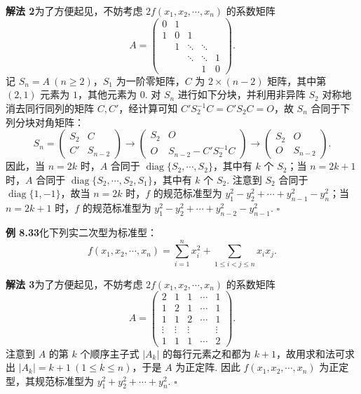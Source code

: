 \documentclass[UTF8,12pt,a4paper,fontset=fandol]{ctexart}
\begin{document}
\noindent\textbf{解法 2}\quad 为了方便起见，不妨考虑 $2f(x_1,x_2,\cdots,x_n)$ 的系数矩阵
\[
A=\left(\begin{array}{ccccc}
0 & 1 &        &        &   \\
1 & 0 & 1      &        &   \\
  & 1 & \ddots & \ddots &   \\
  &   & \ddots & \ddots & 1 \\
  &   &        & 1      & 0
\end{array}\right).
\]
记 $S_n=A\ (n\ge 2)$，$S_1$ 为一阶零矩阵，$C$ 为 $2\times(n-2)$ 矩阵，其中第 $(2,1)$ 元素为 $1$，其他元素为 $0$. 对 $S_n$ 进行如下分块，并利用非异阵 $S_2$ 对称地消去同行同列的矩阵 $C,C'$，经计算可知 $C'S_2^{-1}C=C'S_2C=O$，故 $S_n$ 合同于下列分块对角矩阵：
\[
S_n=\left(\begin{array}{cc}
S_2 & C\\
C' & S_{n-2}
\end{array}\right)
\to
\left(\begin{array}{cc}
S_2 & O\\
O & S_{n-2}-C'S_2^{-1}C
\end{array}\right)
\to
\left(\begin{array}{cc}
S_2 & O\\
O & S_{n-2}
\end{array}\right).
\]
因此，当 $n=2k$ 时，$A$ 合同于 $\operatorname{diag}\{S_2,\cdots,S_2\}$，其中有 $k$ 个 $S_2$；当 $n=2k+1$ 时，$A$ 合同于 $\operatorname{diag}\{S_2,\cdots,S_2,S_1\}$，其中有 $k$ 个 $S_2$. 注意到 $S_2$ 合同于 $\operatorname{diag}\{1,-1\}$，故当 $n=2k$ 时，$f$ 的规范标准型为 $y_1^2-y_2^2+\cdots+y_{n-1}^2-y_n^2$；当 $n=2k+1$ 时，$f$ 的规范标准型为 $y_1^2-y_2^2+\cdots+y_{n-2}^2-y_{n-1}^2$. $\ensuremath{\square}$

\noindent\textbf{例 8.33}\quad 化下列实二次型为标准型：
\[
f(x_1,x_2,\cdots,x_n)=\sum_{i=1}^n x_i^2+\sum_{1\le i<j\le n}x_ix_j.
\]

\noindent\textbf{解法 3}\quad 为了方便起见，不妨考虑 $2f(x_1,x_2,\cdots,x_n)$ 的系数矩阵
\[
A=\left(\begin{array}{ccccc}
2 & 1 & 1 & \cdots & 1\\
1 & 2 & 1 & \cdots & 1\\
1 & 1 & 2 & \cdots & 1\\
\vdots & \vdots & \vdots & & \vdots\\
1 & 1 & 1 & \cdots & 2
\end{array}\right).
\]
注意到 $A$ 的第 $k$ 个顺序主子式 $|A_k|$ 的每行元素之和都为 $k+1$，故用求和法可求出 $|A_k|=k+1\ (1\le k\le n)$，于是 $A$ 为正定阵. 因此 $f(x_1,x_2,\cdots,x_n)$ 为正定型，其规范标准型为 $y_1^2+y_2^2+\cdots+y_n^2$. $\ensuremath{\square}$
\end{document}
